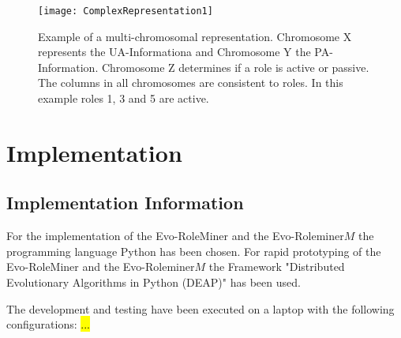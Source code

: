 	\begin{figure}[H]
		\centering
		\texttt{[image: ComplexRepresentation1]}
		\caption{Example of a multi-chromosomal representation. Chromosome X represents the UA-Informationa and Chromosome Y the PA-Information. Chromosome Z determines if a role is active or passive. The columns in all chromosomes are consistent to roles. In this example roles 1, 3 and 5 are active.}
		\label{fig:representation2}
	\end{figure}

\chapter{Implementation}
\section{Implementation Information}
	For the implementation of the Evo-RoleMiner and the Evo-Roleminer$M$ the programming language Python has been chosen. For rapid prototyping of the Evo-RoleMiner and the Evo-Roleminer$M$ the Framework "Distributed Evolutionary Algorithms in Python (DEAP)"\cite{DeRainville:2012} has been used.
	
	The development and testing have been executed on a laptop with the following configurations: \hl{...}
	
